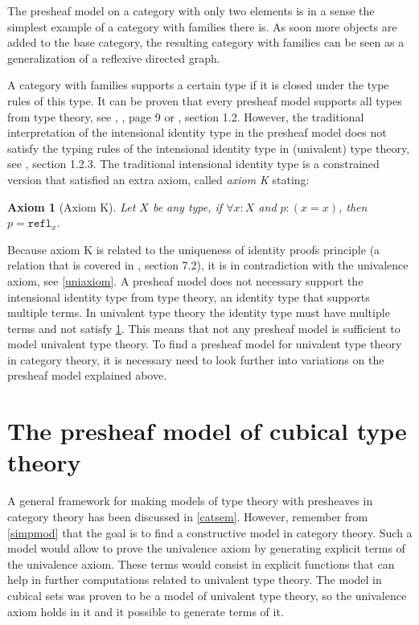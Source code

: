\documentclass[12pt,a4paper,twoside,xetex]{book} %
\newcommand{\keyword}[1]{\emph{#1}\index{#1}}
\newtheorem{axiom}[theorem]{Axiom}
\newcommand{\op}[1]{\mathtt{#1}}
\begin{document}
The presheaf model on a category with only two elements is in a sense the 
simplest example of a category with families there is. As soon more objects are 
added to the base category, the resulting category with families can be seen as 
a generalization of a reflexive directed graph. 

A category with families supports a certain type if it is closed under the type 
rules of this type.  It can be proven that every presheaf model supports all 
types from type theory, see \cite{Hofmann1997}, \cite{Nuyts2018}, page 9 or 
\cite{Huber2016}, section 1.2. However, the traditional interpretation of the 
intensional identity type in the presheaf model does not satisfy the typing 
rules of the intensional identity type in (univalent) type theory, see 
\cite{Huber2016}, section 1.2.3. The traditional intensional identity type is a 
constrained version that satisfied an extra axiom, called \keyword{axiom K} 
stating: 

\begin{axiom}[Axiom K]\label{axiomk}
Let $X$ be any type, if $\forall x : X$ and $p : (x = x)$, then $p = 
\op{refl}_x$.  
\end{axiom}

Because axiom K is related to the uniqueness of identity proofs principle (a 
relation that is covered in \cite{Voevodsky2013}, section 7.2), it is in 
contradiction with the univalence axiom, see \cref{uniaxiom}. A presheaf model 
does not necessary support the intensional identity type from type theory, an 
identity type that supports multiple terms. In univalent type theory the 
identity type must have multiple terms and not satisfy \cref{axiomk}. This 
means that not any presheaf model is sufficient to model univalent type theory. 
To find a presheaf model for univalent type theory in category theory, it is 
necessary need to look further into variations on the presheaf model explained 
above.  

\chapter{The presheaf model of cubical type theory}\label{cubical}

A general framework for making models of type 
theory with presheaves in category theory has been discussed in \cref{catsem}. However, remember from \cref{simpmod} that the goal is to find a constructive model in category theory. Such a model would allow to prove the univalence axiom by generating explicit terms of the univalence axiom. These terms would consist in explicit functions that can help in further computations related to univalent type theory. The model in cubical sets was proven to be a model of univalent type theory, so the univalence axiom holds in it and it possible 
to generate terms of it.  
\end{document}
